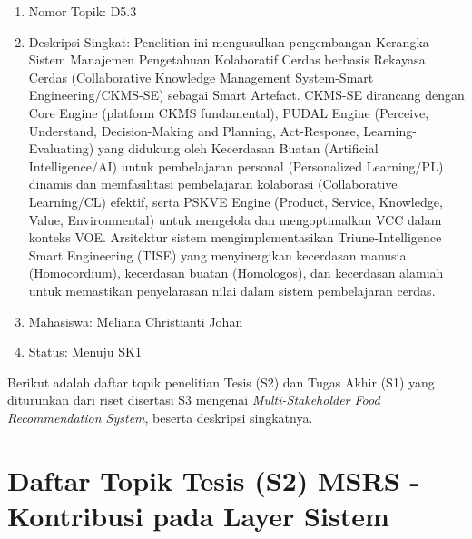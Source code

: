 \documentclass[
  letterpaper,
  DIV=11,
  numbers=noendperiod]{scrreprt}
\providecommand{\tightlist}{%
  \setlength{\itemsep}{0pt}\setlength{\parskip}{0pt}}
\begin{document}
\begin{enumerate}
  \begin{enumerate}
  \def\labelenumii{\arabic{enumii}.}
  \tightlist
  \item
    Nomor Topik: D5.3
  \item
    Deskripsi Singkat: Penelitian ini mengusulkan pengembangan Kerangka
    Sistem Manajemen Pengetahuan Kolaboratif Cerdas berbasis Rekayasa
    Cerdas (Collaborative Knowledge Management System-Smart
    Engineering/CKMS-SE) sebagai Smart Artefact. CKMS-SE dirancang
    dengan Core Engine (platform CKMS fundamental), PUDAL Engine
    (Perceive, Understand, Decision-Making and Planning, Act-Response,
    Learning-Evaluating) yang didukung oleh Kecerdasan Buatan
    (Artificial Intelligence/AI) untuk pembelajaran personal
    (Personalized Learning/PL) dinamis dan memfasilitasi pembelajaran
    kolaborasi (Collaborative Learning/CL) efektif, serta PSKVE Engine
    (Product, Service, Knowledge, Value, Environmental) untuk mengelola
    dan mengoptimalkan VCC dalam konteks VOE. Arsitektur sistem
    mengimplementasikan Triune-Intelligence Smart Engineering (TISE)
    yang menyinergikan kecerdasan manusia (Homocordium), kecerdasan
    buatan (Homologos), dan kecerdasan alamiah untuk memastikan
    penyelarasan nilai dalam sistem pembelajaran cerdas.
  \item
    Mahasiswa: Meliana Christianti Johan
  \item
    Status: Menuju SK1
  \end{enumerate}
\end{enumerate}

Berikut adalah daftar topik penelitian Tesis (S2) dan Tugas Akhir (S1)
yang diturunkan dari riset disertasi S3 mengenai \emph{Multi-Stakeholder
Food Recommendation System}, beserta deskripsi singkatnya.

\section{\texorpdfstring{\textbf{Daftar Topik Tesis (S2) MSRS -
Kontribusi pada Layer
Sistem}}{Daftar Topik Tesis (S2) MSRS - Kontribusi pada Layer Sistem}}\label{daftar-topik-tesis-s2-msrs---kontribusi-pada-layer-sistem}
\end{document}
